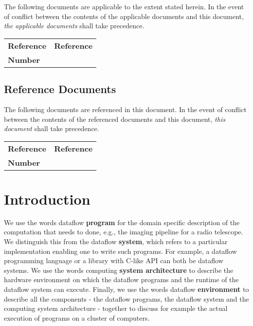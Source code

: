 \documentclass[11pt,a4paper]{article}
\begin{document}
The following documents are applicable to the extent stated herein. In the
event of conflict between the contents of the applicable documents and this
document, \emph{the applicable documents} shall take precedence.

\begin{center}{
\begin{tabularx}{\textwidth}{|X|X|}
    \hline
    \bf{Reference} & \bf{Reference}\\
    \bf{Number} & \\
    \hline
\end{tabularx}}
\end{center}

\subsection*{Reference Documents}

The following documents are referenced in this document. In the event of
conflict between the contents of the referenced documents and this document,
\emph{this document} shall take precedence.

\begin{center}{
\begin{tabularx}{\textwidth}{|X|X|}
    \hline
    \bf{Reference} & \bf{Reference}\\
    \bf{Number} & \\
    \hline
\end{tabularx}}
\end{center}




\newpage
\section{Introduction}

We use the words dataflow {\bf program} for the domain specific
description of the computation that needs to done, e.g., the imaging
pipeline for a radio telescope.  We distinguish this from the dataflow
{\bf system}, which refers to a particular implementation enabling one
to write such programs. For example, a dataflow programming language
or a library with C-like API can both be dataflow systems.  We use the
words computing {\bf system architecture} to describe the hardware
environment on which the dataflow programs and the runtime of the
dataflow system can execute.  Finally, we use the words dataflow {\bf
  environment} to describe all the components - the dataflow programs,
the dataflow system and the computing system architecture - together
to discuss for example the actual execution of programs on a cluster
of computers.
\end{document}
